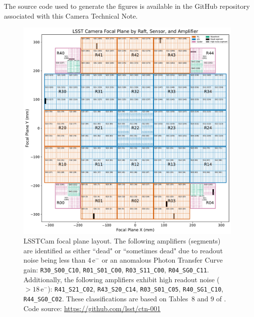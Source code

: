 \documentclass[CTN,authoryear,toc]{lsstdoc}
\begin{document}
The source code used to generate the figures is available in the GitHub repository associated with this Camera Technical Note.

\clearpage

\begin{figure}
  \centering
  \includegraphics[width=\textwidth]{figures/LSSTCam_focal_plane_CTN_001_FIG1.pdf}
  \caption{LSSTCam focal plane layout. The following amplifiers (segments) are identified as either ``dead" or ``sometimes dead" due to readout noise being less than $4\,\mathrm{e}^{-}$ or an anomalous Photon Transfer Curve gain: {\tt{R30\_S00\_C10}}, {\tt{R01\_S01\_C00}}, {\tt{R03\_S11\_C00}}, {\tt{R04\_SG0\_C11}}. Additionally, the following amplifiers exhibit high readout noise ($> 18\,\mathrm{e}^{-}$): {\tt{R41\_S21\_C02}}, {\tt{R43\_S20\_C14}}, {\tt{R03\_S01\_C05}}, {\tt{R40\_SG1\_C10}}, {\tt{R44\_SG0\_C02}}. These classifications are based on Tables~8 and 9 of . Code source: \url{https://github.com/lsst/ctn-001}}
  \label{fig:focal_plane_1}
\end{figure}

\clearpage
\end{document}
